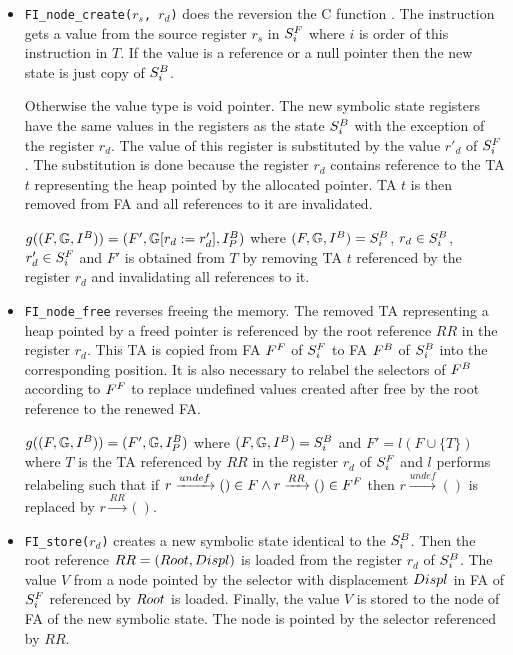 \begin{itemize}
	\item {\tt FI\_node\_create($r_s$, $r_d$)}
		does the reversion the C function .
		The instruction gets a value from the source register $r_s$ in $S^{F}_{i}$
		where $i$ is order of this instruction in $T$.
		If the value is a reference or a null pointer then the new
		state is just copy of $S^{B}_{i}$.
		
		Otherwise the value type is void pointer.
		The new symbolic state registers have the same values
		in the registers as the state $S^{B}_{i}$ with
		the exception of the register $r_d$.
		The value of this register is substituted by the value $r'_{d}$ of $S^{F}_{i}$.
		The substitution is done because the register $r_d$ contains reference to the TA $t$
		representing the heap pointed by the allocated pointer.
		TA $t$ is then removed from FA and all references to it are invalidated.

		$g((F, \mathbb{G}, I^{B})) = (F', \mathbb{G} [r_{d} := r'_{d}]
			, I^{B}_{P})$
			where $(F, \mathbb{G}, I^{B}) = S^{B}_{i}$,
			$r_{d} \in S^{B}_{i}$, $r'_{d} \in S^{F}_{i}$
			and $F'$ is obtained from $T$ by removing TA $t$ referenced by the register $r_d$
			and invalidating all references to it.

	\item {\tt FI\_node\_free}
		reverses freeing the memory.
		The removed TA representing a heap pointed by a freed pointer
		is referenced by the root reference $RR$ in the register $r_d$.
		This TA is copied from FA $F^{F}$ of $S^{F}_{i}$ to FA $F^{B}$ of $S^{B}_{i}$ into the
		corresponding position.
		It is also necessary to relabel the selectors of $F^{B}$
		according to $F^{F}$ to replace undefined values created
		after free by the root reference to the renewed FA.

		$g((F, \mathbb{G}, I^{B})) = (F', \mathbb{G}, I^{B}_{P})$
			where $(F, \mathbb{G}, I^{B}) = S^{B}_{i}$ and $F'= l(F \cup \{T\})$ where
			$T$ is the TA referenced by $RR$ in the register $r_d$ of $S^{F}_{i}$
			and $l$ performs relabeling such that if $r \xrightarrow{undef} () \in F
			\wedge r \xrightarrow{RR} () \in F^{F}$ then $r \xrightarrow{undef} ()$ is
			replaced by $r \xrightarrow{RR} ()$.

	\item {\tt FI\_store($r_d$)}
		creates a new symbolic state identical to the $S^{B}_{i}$.
		Then the root reference $RR=(Root,Displ)$ is loaded from the register $r_d$ of $S^{B}_{i}$.
		The value $V$ from a node pointed by the selector with displacement $Displ$ in FA of $S^{F}_{i}$
		referenced by $Root$ is loaded.
		Finally, the value $V$ is stored to the node of FA of the new symbolic state.
		The node is pointed by the selector referenced by $RR$.


\end{itemize}
